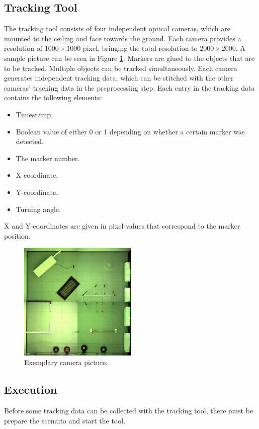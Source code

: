 \documentclass[twoside]{article}
\begin{document}
\subsection{Tracking Tool} %
The tracking tool consists of four independent optical cameras, which are mounted to the ceiling and face towards the ground. Each camera provides a resolution of $1000 \times 1000$ pixel, bringing the total resolution to $2000 \times 2000$. A sample picture can be seen in Figure \ref{fig:setup}. Markers are glued to the objects that are to be tracked. Multiple objects can be tracked simultaneously. Each camera generates independent tracking data, which can be stitched with the other cameras' tracking data in the preprocessing step. Each entry in the tracking data contains the following elements:

\begin{itemize}
	\item Timestamp.
	\item Boolean value of either 0 or 1 depending on whether a certain marker was detected.
	\item The marker number. 
	\item X-coordinate.
	\item Y-coordinate.
	\item Turning angle.
\end{itemize}
X and Y-coordinates are given in pixel values that correspond to the marker position. 

\begin{figure} [H]
	\begin{center}
		\includegraphics[width=0.5\textwidth]{pictures/setup.jpg}
		\caption{Exemplary camera picture.}
		\label{fig:setup}
	\end{center}
\end{figure}


\subsection{Execution} %
Before some tracking data can be collected with the tracking tool, there must be prepare the scenario and start the tool.
\end{document}

